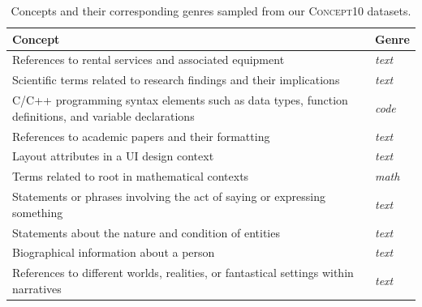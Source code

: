 \begin{table}[ht]
\centering
\begin{tabular}{@{}p{}p{}@{}}
\toprule
\textbf{Concept} & \textbf{Genre} \\ \midrule
References to rental services and associated equipment & \textit{text} \\
Scientific terms related to research findings and their implications & \textit{text} \\
C/C++ programming syntax elements such as data types, function definitions, and variable declarations & \textit{code} \\
References to academic papers and their formatting & \textit{text} \\
Layout attributes in a UI design context & \textit{text} \\
Terms related to root in mathematical contexts & \textit{math} \\
Statements or phrases involving the act of saying or expressing something & \textit{text} \\
Statements about the nature and condition of entities & \textit{text} \\
Biographical information about a person & \textit{text} \\
References to different worlds, realities, or fantastical settings within narratives & \textit{text} \\ \bottomrule
\end{tabular}
\caption{Concepts and their corresponding genres sampled from our \textsc{Concept10} datasets.}
\label{tab:concepts-genres}
\end{table}